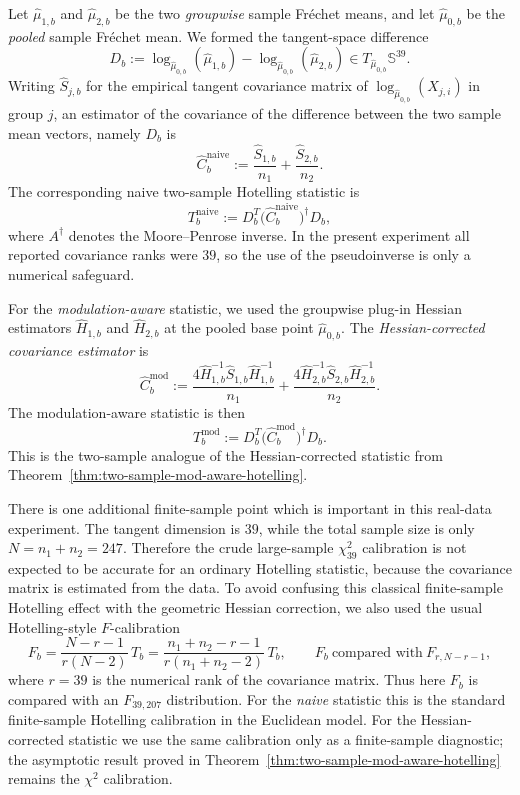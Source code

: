 \documentclass{amsart}
\theoremstyle{definition}
\theoremstyle{remark}
\newcommand\0{\boldsymbol{0}}
\begin{document}
Let
\(\hat\mu_{1,b}\) and \(\hat\mu_{2,b}\) be the two\textit{ groupwise} sample Fr\'echet
means, and let \(\hat\mu_{0,b}\) be the\textit{ pooled} sample Fr\'echet mean.  We formed
the tangent-space difference
\[
D_b
:=
\log_{\hat\mu_{0,b}}(\hat\mu_{1,b})
-
\log_{\hat\mu_{0,b}}(\hat\mu_{2,b})
\in T_{\hat\mu_{0,b}}\mathbb S^{39}.
\]
Writing \(\widehat S_{j,b}\) for the empirical tangent covariance matrix of
\(\log_{\hat\mu_{0,b}}(X_{j,i})\) in group \(j\), an estimator of the covariance of the difference between the two sample mean vectors, namely \(D_b\) is
\[
\widehat C^{\mathrm{naive}}_b
:=
\frac{\widehat S_{1,b}}{n_1}
+
\frac{\widehat S_{2,b}}{n_2}.
\]
The corresponding naive two-sample Hotelling statistic is
\[
T^{\mathrm{naive}}_b
:=
D_b^T
\bigl(\widehat C^{\mathrm{naive}}_b\bigr)^{\dagger}
D_b,
\]
where \(A^\dagger\) denotes the Moore--Penrose inverse.  In the present
experiment all reported covariance ranks were \(39\), so the use of the
pseudoinverse is only a numerical safeguard.

For the \textit{modulation-aware} statistic, we used the groupwise plug-in Hessian
estimators \(\widehat H_{1,b}\) and \(\widehat H_{2,b}\) at the pooled base point
\(\hat\mu_{0,b}\).  The \textit{Hessian-corrected covariance estimator} is
\[
\widehat C^{\mathrm{mod}}_b
:=
\frac{
4\widehat H_{1,b}^{-1}\widehat S_{1,b}\widehat H_{1,b}^{-1}
}{n_1}
+
\frac{
4\widehat H_{2,b}^{-1}\widehat S_{2,b}\widehat H_{2,b}^{-1}
}{n_2}.
\]
The modulation-aware statistic is then
\[
T^{\mathrm{mod}}_b
:=
D_b^T
\bigl(\widehat C^{\mathrm{mod}}_b\bigr)^{\dagger}
D_b.
\]
This is the two-sample analogue of the Hessian-corrected statistic from
Theorem~\ref{thm:two-sample-mod-aware-hotelling}.

There is one additional finite-sample point which is important in this real-data
experiment.  The tangent dimension is \(39\), while the total sample size is only
\(N= n_1+ n_2= 247\).  Therefore the crude large-sample \(\chi^2_{39}\) calibration is not
expected to be accurate for an ordinary Hotelling statistic, because the
covariance matrix is estimated from the data.  To avoid confusing this classical
finite-sample Hotelling effect with the geometric Hessian correction, we also
used the usual Hotelling-style \(F\)-calibration
\[
F_b
=
\frac{N-r-1}{r(N-2)}\,T_b = \frac{n_1+n_2-r-1}{r(n_1+n_2-2)}\,T_b,
\qquad
F_b\ \text{compared with}\ F_{r,N-r-1},
\]
where \(r=39\) is the numerical rank of the covariance matrix.  Thus here
\(F_b\) is compared with an \(F_{39,207}\) distribution.  For the \textit{naive} statistic
this is the standard finite-sample Hotelling calibration in the Euclidean
model.  For the Hessian-corrected statistic we use the same calibration only as
a finite-sample diagnostic; the asymptotic result proved in
Theorem~\ref{thm:two-sample-mod-aware-hotelling} remains the \(\chi^2\)
calibration.
\end{document}
